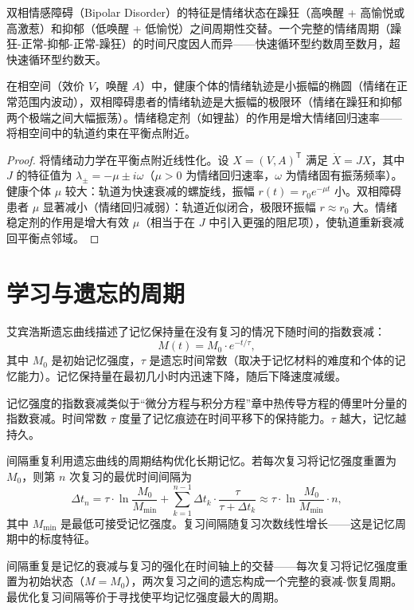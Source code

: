 \begin{proposition}[双相情感障碍的情绪周期]\label{prop:bipolar_cycle}
双相情感障碍（Bipolar Disorder）的特征是情绪状态在躁狂（高唤醒 + 高愉悦或高激惹）和抑郁（低唤醒 + 低愉悦）之间周期性交替。一个完整的情绪周期（躁狂-正常-抑郁-正常-躁狂）的时间尺度因人而异——快速循环型约数周至数月，超快速循环型约数天。

在相空间（效价 $V$，唤醒 $A$）中，健康个体的情绪轨迹是小振幅的椭圆（情绪在正常范围内波动），双相障碍患者的情绪轨迹是大振幅的极限环（情绪在躁狂和抑郁两个极端之间大幅振荡）。情绪稳定剂（如锂盐）的作用是增大情绪回归速率——将相空间中的轨道约束在平衡点附近。
\end{proposition}

\begin{proof}
将情绪动力学在平衡点附近线性化。设 $X = (V, A)^{\mathsf T}$ 满足 $\dot X = J X$，其中 $J$ 的特征值为 $\lambda_{\pm} = -\mu \pm i\omega$（$\mu > 0$ 为情绪回归速率，$\omega$ 为情绪固有振荡频率）。健康个体 $\mu$ 较大：轨道为快速衰减的螺旋线，振幅 $r(t) = r_0 e^{-\mu t}$ 小。双相障碍患者 $\mu$ 显著减小（情绪回归减弱）：轨道近似闭合，极限环振幅 $r \approx r_0$ 大。情绪稳定剂的作用是增大有效 $\mu$（相当于在 $J$ 中引入更强的阻尼项），使轨道重新衰减回平衡点邻域。
\end{proof}

\section{学习与遗忘的周期}

\begin{definition}[艾宾浩斯遗忘曲线]\label{def:ebbinghaus}
艾宾浩斯遗忘曲线描述了记忆保持量在没有复习的情况下随时间的指数衰减：
\[
M(t) = M_0 \cdot e^{-t/\tau},
\]
其中 $M_0$ 是初始记忆强度，$\tau$ 是遗忘时间常数（取决于记忆材料的难度和个体的记忆能力）。记忆保持量在最初几小时内迅速下降，随后下降速度减缓。

记忆强度的指数衰减类似于“微分方程与积分方程”章中热传导方程的傅里叶分量的指数衰减。时间常数 $\tau$ 度量了记忆痕迹在时间平移下的保持能力。$\tau$ 越大，记忆越持久。
\end{definition}

\begin{proposition}[间隔重复的最优复习周期]\label{prop:spaced_repetition}
间隔重复利用遗忘曲线的周期结构优化长期记忆。若每次复习将记忆强度重置为 $M_0$，则第 $n$ 次复习的最优时间间隔为
\[
\Delta t_n = \tau \cdot \ln\frac{M_0}{M_{\min}} + \sum_{k=1}^{n-1} \Delta t_k \cdot \frac{\tau}{\tau + \Delta t_k} \approx \tau \cdot \ln\frac{M_0}{M_{\min}} \cdot n,
\]
其中 $M_{\min}$ 是最低可接受记忆强度。复习间隔随复习次数线性增长——这是记忆周期中的标度特征。

间隔重复是记忆的衰减与复习的强化在时间轴上的交替——每次复习将记忆强度重置为初始状态（$M = M_0$），两次复习之间的遗忘构成一个完整的衰减-恢复周期。最优化复习间隔等价于寻找使平均记忆强度最大的周期。
\end{proposition}

